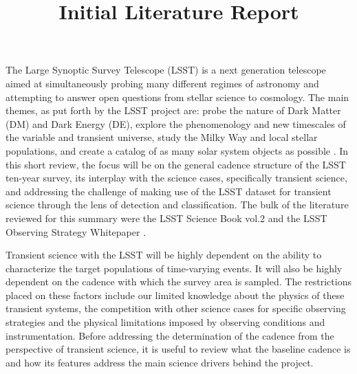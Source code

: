 \documentclass[12pt]{article}
\title{Initial Literature Report}
\begin{document}
\par

\vspace{7pt}
The Large Synoptic Survey Telescope (LSST) is a next generation telescope aimed at simultaneously probing many different regimes of astronomy and attempting to answer open questions from stellar science to cosmology. The main themes, as put forth by the LSST project are: probe the nature of Dark Matter (DM) and Dark Energy (DE), explore the phenomenology and new timescales of the variable and transient universe, study the Milky Way and local stellar populations, and create a catalog of as many solar system objects as possible \citep{LSSTScienceCollaboration2017}. In this short review, the focus will be on the general cadence structure of the LSST ten-year survey, its interplay with the science cases, specifically transient science, and addressing the challenge of making use of the LSST dataset for transient science through the lens of detection and classification. The bulk of the literature reviewed for this summary were the LSST Science Book vol.2 and the LSST Observing Strategy Whitepaper \citep{LSSTScienceCollaboration2009,LSSTScienceCollaboration2017}. \par
Transient science with the LSST will be highly dependent on the ability to characterize the target populations of time-varying events. It will also be highly dependent on the cadence with which the survey area is sampled. The restrictions placed on these factors include our limited knowledge about the physics of these transient systems, the competition with other science cases for specific observing strategies and the physical limitations imposed by observing conditions and instrumentation. Before addressing the determination of the cadence from the perspective of transient science, it is useful to review what the baseline cadence is and how its features address the main science drivers behind the project. \par
\end{document}
